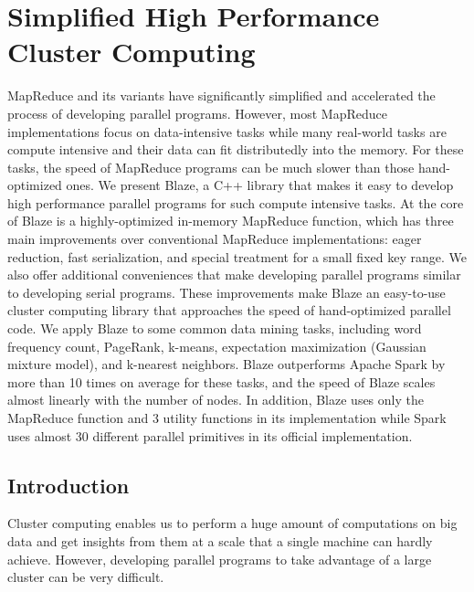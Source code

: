 \chapter{Simplified High Performance Cluster Computing}
MapReduce and its variants have significantly simplified and accelerated the process of developing parallel programs.
However, most MapReduce implementations focus on data-intensive tasks while many real-world tasks are compute intensive and their data can fit distributedly into the memory.
For these tasks, the speed of MapReduce programs can be much slower than those hand-optimized ones.
We present Blaze, a C++ library that makes it easy to develop high performance parallel programs for such compute intensive tasks.
At the core of Blaze is a highly-optimized in-memory MapReduce function, which has three main improvements over conventional MapReduce implementations:
eager reduction, fast serialization, and special treatment for a small fixed key range.
We also offer additional conveniences that make developing parallel programs similar to developing serial programs.
These improvements make Blaze an easy-to-use cluster computing library that approaches the speed of hand-optimized parallel code.
We apply Blaze to some common data mining tasks, including word frequency count, PageRank, k-means, expectation maximization (Gaussian mixture model), and k-nearest neighbors.
Blaze outperforms Apache Spark by more than 10 times on average for these tasks, and the speed of Blaze scales almost linearly with the number of nodes.
In addition, Blaze uses only the MapReduce function and 3 utility functions in its implementation while Spark uses almost 30 different parallel primitives in its official implementation.

\section{Introduction}

Cluster computing enables us to perform a huge amount of computations on big data and get insights from them at a scale that a single machine can hardly achieve.
However, developing parallel programs to take advantage of a large cluster can be very difficult.

